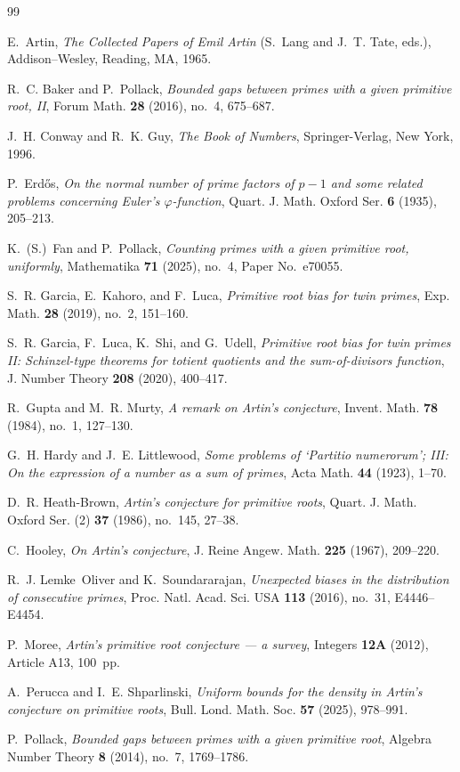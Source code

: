 \documentclass[11pt]{amsart}
\theoremstyle{definition}
\begin{document}
\begin{thebibliography}{99}

	E.~Artin,
	\emph{The Collected Papers of Emil Artin} (S.~Lang and J.~T. Tate, eds.),
	Addison--Wesley, Reading, MA, 1965.

	R.~C. Baker and P.~Pollack,
	\emph{Bounded gaps between primes with a given primitive root, II},
	Forum Math. \textbf{28} (2016), no.~4, 675--687.

	J.~H. Conway and R.~K. Guy,
	\emph{The Book of Numbers},
	Springer-Verlag, New York, 1996.

	P.~Erd\H{o}s,
	\emph{On the normal number of prime factors of $p-1$ and some related problems
		concerning Euler's $\varphi$-function},
	Quart. J. Math. Oxford Ser. \textbf{6} (1935), 205--213.

	K.~(S.)~Fan and P.~Pollack,
	\emph{Counting primes with a given primitive root, uniformly},
	Mathematika \textbf{71} (2025), no.~4, Paper No.~e70055.

	S.~R. Garcia, E.~Kahoro, and F.~Luca,
	\emph{Primitive root bias for twin primes},
	Exp. Math. \textbf{28} (2019), no.~2, 151--160.

	S.~R. Garcia, F.~Luca, K.~Shi, and G.~Udell,
	\emph{Primitive root bias for twin primes II: Schinzel-type theorems for
		totient quotients and the sum-of-divisors function},
	J. Number Theory \textbf{208} (2020), 400--417.

	R.~Gupta and M.~R. Murty,
	\emph{A remark on Artin's conjecture},
	Invent. Math. \textbf{78} (1984), no.~1, 127--130.

	G.~H. Hardy and J.~E. Littlewood,
	\emph{Some problems of `Partitio numerorum'; III: On the expression of a
		number as a sum of primes},
	Acta Math. \textbf{44} (1923), 1--70.

	D.~R. Heath-Brown,
	\emph{Artin's conjecture for primitive roots},
	Quart. J. Math. Oxford Ser. (2) \textbf{37} (1986), no.~145, 27--38.

	C.~Hooley,
	\emph{On Artin's conjecture},
	J. Reine Angew. Math. \textbf{225} (1967), 209--220.

	R.~J. Lemke~Oliver and K.~Soundararajan,
	\emph{Unexpected biases in the distribution of consecutive primes},
	Proc. Natl. Acad. Sci. USA \textbf{113} (2016), no.~31, E4446--E4454.

	P.~Moree,
	\emph{Artin's primitive root conjecture --- a survey},
	Integers \textbf{12A} (2012), Article A13, 100~pp.

	A.~Perucca and I.~E. Shparlinski,
	\emph{Uniform bounds for the density in Artin's conjecture on primitive roots},
	Bull. Lond. Math. Soc. \textbf{57} (2025), 978--991.

	P.~Pollack,
	\emph{Bounded gaps between primes with a given primitive root},
	Algebra Number Theory \textbf{8} (2014), no.~7, 1769--1786.

\end{thebibliography}
\end{document}

